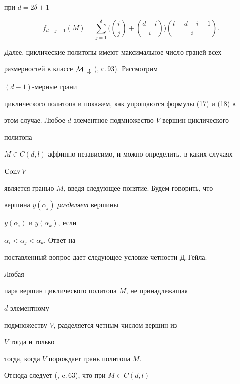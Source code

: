 при $d=2\delta+1$


\begin{equation}


f_{d-j-1}(M)=\sum^\delta_{j=1}\Biggl(\binom{i}{j}+


\binom{d-i}{i}\Biggr)\binom{l-d+i-1}{i}.


\end{equation}





Далее, циклические политопы имеют максимальное число граней всех


размерностей в классе $\cal M_{d,l}$ (\cite{Em}, с.\,93). Рассмотрим


$(d-1)$-мерные грани


циклического политопа и покажем, как упрощаются формулы (17) и (18) в


этом случае. Любое $d$-элементное подмножество $V$ вершин циклического


политопа


$M\in C(d,l)$ аффинно независимо, и можно определить, в каких случаях


$\operatorname{Conv} V$


является гранью $M$, введя следующее понятие. Будем говорить, что


вершина $y(\alpha_j)$ {\em разделяет} вершины


$y(\alpha_i)$ и $y(\alpha_k)$, если


$\alpha_i<\alpha_j<\alpha_k$. Ответ на


поставленный вопрос дает следующее условие четности Д.\,Гейла.





\begin{lem} Любая


пара вершин циклического политопа $M$, не принадлежащая


$d$-элементному


подмножеству $V$, разделяется четным числом вершин из


$V$ тогда и только


тогда, когда $V$ порождает грань политопа $M$.


\end{lem}





Отсюда следует (\cite{Gru}, c.\,63), что при $M\in C(d,l)$


